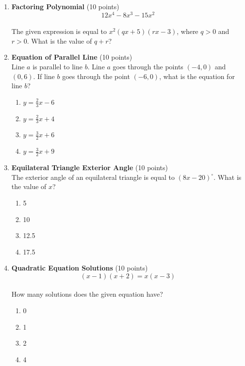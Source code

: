 \begin{enumerate}
  \item \textbf{Factoring Polynomial} (10 points)\\
  $$12 x^4-8 x^3-15 x^2$$\\
  The given expression is equal to $x^2(q x+5)(r x-3)$, where $q>0$ and $r>0$. What is the value of $q+r$?
  \begin{subanswer}
  \end{subanswer}

  \item \textbf{Equation of Parallel Line} (10 points)\\
  Line $a$ is parallel to line $b$. Line $a$ goes through the points $(-4,0)$ and $(0,6)$. If line $b$ goes through the point $(-6,0)$, what is the equation for line $b$?
  \begin{enumerate}[label=\Alph*.]
    \item $y=\frac{2}{3} x-6$
    \item $y=\frac{2}{3} x+4$
    \item $y=\frac{3}{2} x+6$
    \item $y=\frac{3}{2} x+9$
  \end{enumerate}
  \begin{subanswer}
  \end{subanswer}

  \item \textbf{Equilateral Triangle Exterior Angle} (10 points)\\
  The exterior angle of an equilateral triangle is equal to $(8x-20)^\circ$. What is the value of $x$?
  \begin{enumerate}[label=\Alph*.]
    \item 5
    \item 10
    \item 12.5
    \item 17.5
  \end{enumerate}
  \begin{subanswer}
  \end{subanswer}

  \item \textbf{Quadratic Equation Solutions} (10 points)\\
  $$ (x-1)(x+2)=x(x-3)$$\\
  How many solutions does the given equation have?
  \begin{enumerate}[label=\Alph*.]
    \item 0
    \item 1
    \item 2
    \item 4
  \end{enumerate}
  \begin{subanswer}
  \end{subanswer}


\end{enumerate}
